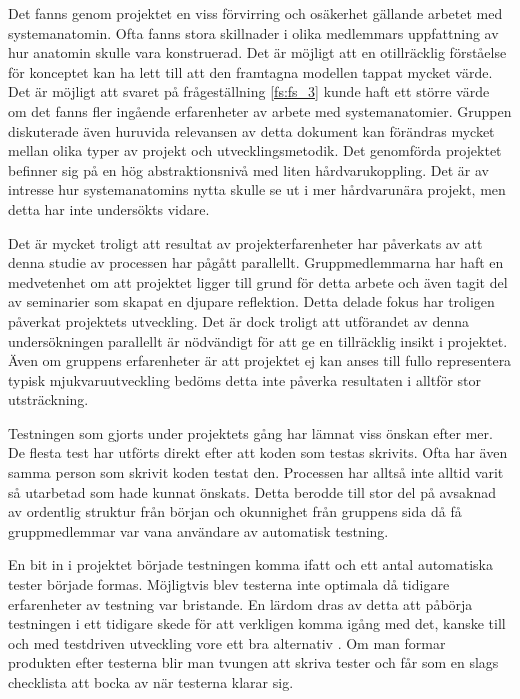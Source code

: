 

Det fanns genom projektet en viss förvirring och osäkerhet gällande arbetet med systemanatomin. Ofta fanns stora skillnader i olika medlemmars uppfattning av hur anatomin skulle vara konstruerad. Det är möjligt att en otillräcklig förståelse för konceptet kan ha lett till att den framtagna modellen tappat mycket värde. Det är möjligt att svaret på frågeställning \ref{fs:fs_3} kunde haft ett större värde om det fanns fler ingående erfarenheter av arbete med systemanatomier. Gruppen diskuterade även huruvida relevansen av detta dokument kan förändras mycket mellan olika typer av projekt och utvecklingsmetodik. Det genomförda projektet befinner sig på en hög abstraktionsnivå med liten hårdvarukoppling. Det är av intresse hur systemanatomins nytta skulle se ut i mer hårdvarunära projekt, men detta har inte undersökts vidare.

Det är mycket troligt att resultat av projekterfarenheter har påverkats av att denna studie av processen har pågått parallellt. Gruppmedlemmarna har haft en medvetenhet om att projektet ligger till grund för detta arbete och även tagit del av seminarier som skapat en djupare reflektion. Detta delade fokus har troligen påverkat projektets utveckling. Det är dock troligt att utförandet av denna undersökningen parallellt är nödvändigt för att ge en tillräcklig insikt i projektet. Även om gruppens erfarenheter är att projektet ej kan anses till fullo representera typisk mjukvaruutveckling bedöms detta inte påverka resultaten i alltför stor utsträckning.

Testningen som gjorts under projektets gång har lämnat viss önskan efter mer. De flesta test har utförts direkt efter att koden som testas skrivits. Ofta har även samma person som skrivit koden testat den. Processen har alltså inte alltid varit så utarbetad som hade kunnat önskats. Detta berodde till stor del på avsaknad av ordentlig struktur från början och okunnighet från gruppens sida då få gruppmedlemmar var vana användare av automatisk testning.

En bit in i projektet började testningen komma ifatt och ett antal automatiska tester började formas. Möjligtvis blev testerna inte optimala då tidigare erfarenheter av testning var bristande. En lärdom dras av detta att påbörja testningen i ett tidigare skede för att verkligen komma igång med det, kanske till och med testdriven utveckling vore ett bra alternativ \cite{TDD}. Om man formar produkten efter testerna blir man tvungen att skriva tester och får som en slags checklista att bocka av när testerna klarar sig.

